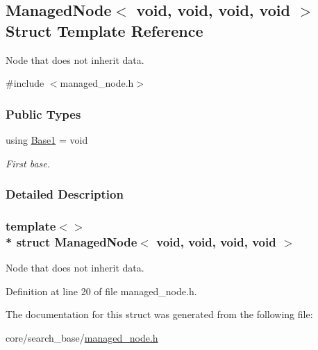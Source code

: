 \hypertarget{structManagedNode_3_01void_00_01void_00_01void_00_01void_01_4}{}\subsection{Managed\+Node$<$ void, void, void, void $>$ Struct Template Reference}
\label{structManagedNode_3_01void_00_01void_00_01void_00_01void_01_4}


Node that does not inherit data.  




{\ttfamily \#include $<$managed\+\_\+node.\+h$>$}

\subsubsection*{Public Types}
\begin{DoxyCompactItemize}
\item 
using \hyperlink{structManagedNode_3_01void_00_01void_00_01void_00_01void_01_4_af577314cd1c22560be5969fa5a44343c}{Base1} = void\hypertarget{structManagedNode_3_01void_00_01void_00_01void_00_01void_01_4_af577314cd1c22560be5969fa5a44343c}{}\label{structManagedNode_3_01void_00_01void_00_01void_00_01void_01_4_af577314cd1c22560be5969fa5a44343c}

\begin{DoxyCompactList}\small\item\em First base. \end{DoxyCompactList}\end{DoxyCompactItemize}


\subsubsection{Detailed Description}
\subsubsection*{template$<$$>$\\*
struct Managed\+Node$<$ void, void, void, void $>$}

Node that does not inherit data. 

Definition at line 20 of file managed\+\_\+node.\+h.



The documentation for this struct was generated from the following file\+:\begin{DoxyCompactItemize}
\item 
core/search\+\_\+base/\hyperlink{managed__node_8h}{managed\+\_\+node.\+h}\end{DoxyCompactItemize}
